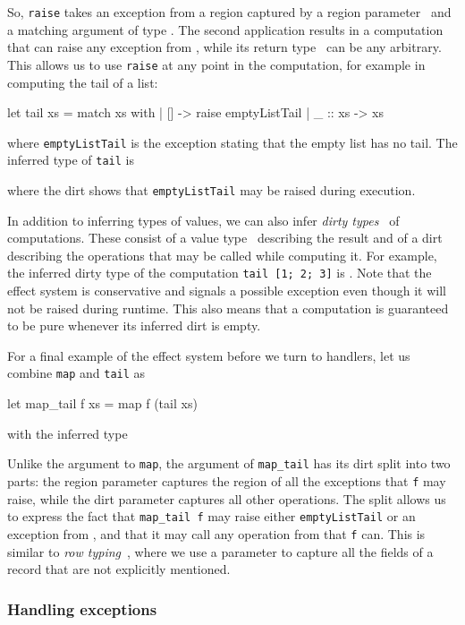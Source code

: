 \documentclass{LMCS}
\let\inline\lstinline
\begin{document}
So, \inline{raise} takes an exception from a region captured by a region parameter~
and a matching argument of type .
The second application results in a computation that can raise any exception from ,
while its return type~ can be any arbitrary.
This allows us to use \inline{raise} at any point in the computation,
for example in computing the tail of a list:
\begin{source}
  let tail xs =
    match xs with
    | [] -> raise emptyListTail
    | _ :: xs -> xs
\end{source}
where \inline{emptyListTail} is the exception stating that the empty list has no tail.
The inferred type of \inline{tail} is

where the dirt shows that \inline{emptyListTail} may be raised during execution.

In addition to inferring types of values, we can also infer \emph{dirty types~} of computations.
These consist of a value type~ describing the result
and of a dirt~ describing the operations that may be called while computing it.
For example, the inferred dirty type of the computation \inline{tail [1; 2; 3]} is .
Note that the effect system is conservative and signals a possible exception even though it will not be raised during runtime.
This also means that a computation is guaranteed to be pure whenever its inferred dirt is empty.

For a final example of the effect system before we turn to handlers,
let us combine \inline{map} and \inline{tail} as
\begin{source}
  let map_tail f xs = map f (tail xs)
\end{source}
with the inferred type

Unlike the argument to \inline{map},
the argument of \inline{map_tail} has its dirt split into two parts:
the region parameter  captures the region of all the exceptions that \inline{f} may raise,
while the dirt parameter  captures all other operations.
The split allows us to express the fact that \inline{map_tail f} may raise either \inline{emptyListTail} or an exception from ,
and that it may call any operation from  that \inline{f} can.
This is similar to \emph{row typing}~\cite{remy1993type},
where we use a parameter to capture all the fields of a record that are not explicitly mentioned.


\subsubsection{Handling exceptions}
\label{ssub:handling-exceptions}
\end{document}
